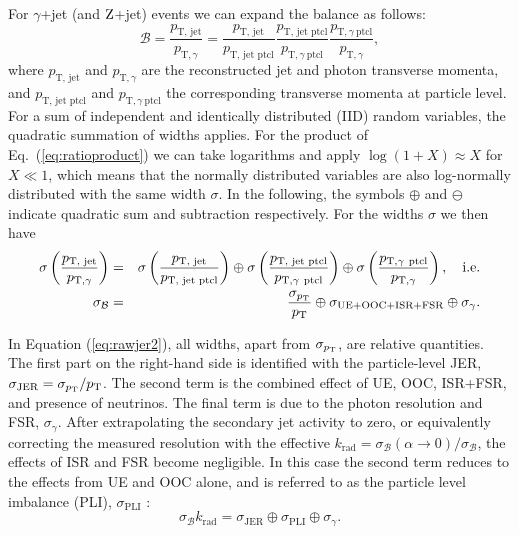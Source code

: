 \documentclass[11pt,twoside,a4paper,cmspaper,final,collab]{cms-tdr}
\begin{document}
For $\gamma$+jet (and $\mathrm{Z}$+jet) events we can expand the \pt balance as follows:
\begin{equation}\label{eq:ratioproduct}
\mathcal{B}=\frac{p_\text{T, jet}}{p_{\mathrm{T}, \gamma}} =
\frac{p_\text{T, jet}}{p_\text{T, jet ptcl}}
\frac{p_\text{T, jet ptcl}}{p_{\mathrm{T}, \gamma~\mathrm{ptcl}}}
\frac{p_{\mathrm{T}, \gamma~\mathrm{ptcl}}}{p_{\mathrm{T}, \gamma}},
\end{equation}
where $p_\text{T, jet}$ and $p_{\mathrm{T}, \gamma}$ are the reconstructed jet and photon transverse momenta, and $p_\text{T, jet ptcl}$ and $p_{\mathrm{T}, \gamma~\mathrm{ ptcl}}$ the corresponding transverse momenta at particle level.
For a sum of independent and identically distributed (IID) random variables, the quadratic summation of widths applies. For the product of Eq.~(\ref{eq:ratioproduct}) we can take logarithms and apply $\log(1+X)\approx X$ for $X \ll 1$, which means that the normally distributed variables are also log-normally distributed with the same width $\sigma$. In the following, the symbols $\oplus$ and $\ominus$ indicate quadratic sum and subtraction respectively. For the widths $\sigma$ we then have
\begin{eqnarray}\label{eq:rawjer}
\sigma\left(\frac{p_\text{T, jet}}{p_{\mathrm{T}, \gamma}}\right) &=&
\sigma\left(\frac{p_\text{T, jet}}{p_\text{T, jet ptcl}}\right)\oplus
\sigma\left(\frac{p_\text{T, jet ptcl}}{p_{\mathrm{T}, \gamma~\mathrm{ptcl}}}\right)\oplus
\sigma\left(\frac{p_{\mathrm{T}, \gamma~\mathrm{ptcl}}}{p_{\mathrm{T}, \gamma}}\right),\quad{\mbox{i.e.}}\\
\sigma_{\mathcal{B}} &=& \frac{\sigma_{p_{\mathrm{T}}}}{p_{\mathrm{T}}}\oplus
\sigma_\mathrm{UE+OOC+ISR+FSR} \oplus \sigma_{\gamma}. \label{eq:rawjer2}
\end{eqnarray}

In Equation (\ref{eq:rawjer2}), all widths, apart from $\sigma_{p_{\mathrm{T}}}$, are relative quantities.
The first part on the right-hand side is identified with the particle-level JER, $\sigma_\mathrm{JER} = \sigma_{p_{\mathrm{T}}}/p_{\mathrm{T}}$. The second term is the combined effect of UE, OOC, ISR+FSR, and presence of neutrinos.
The final term is
due to the photon \pt resolution and FSR, $\sigma_\gamma$. After extrapolating the secondary jet activity to zero, or equivalently correcting the measured resolution with the effective
$k_\text{rad}=\sigma_{\mathcal{B}}(\alpha\to 0) / \sigma_{\mathcal{B}}$,
the effects of ISR and FSR become negligible. In this case the second term reduces to the effects from UE and OOC alone, and is referred to as the particle level imbalance (PLI), $\sigma_\mathrm{PLI}$ :
\begin{equation}\label{eq:rawjerpli}
\sigma_{\mathcal{B}} k_\text{rad}= \sigma_\mathrm{JER} \oplus
\sigma_\mathrm{PLI}\oplus \sigma_{\gamma}.
\end{equation}
\end{document}
